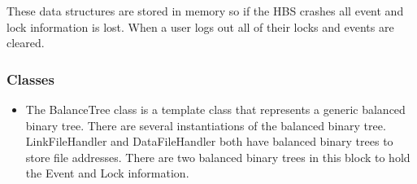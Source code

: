 These data structures are stored in memory so if the HBS crashes all event
and lock information is lost. When a user logs out all of their locks and
events are cleared.

\subsubsection*{Classes}

\begin{itemize}

  \item The BalanceTree class is a template class that represents a
  generic balanced binary tree.  There are several instantiations of
  the balanced binary tree.  LinkFileHandler and DataFileHandler both
  have balanced binary trees to store file addresses.  There are two
  balanced binary trees in this block to hold the Event and Lock
  information. 


\end{itemize}
